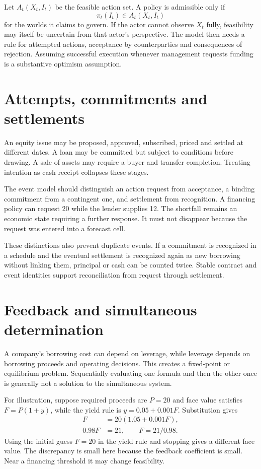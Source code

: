 Let $A_t(X_t,I_t)$ be the feasible action set. A policy is admissible only if
\begin{equation}
 \pi_t(I_t)\in A_t(X_t,I_t)
\end{equation}
for the worlds it claims to govern. If the actor cannot observe $X_t$ fully, feasibility may itself be uncertain from that actor's perspective. The model then needs a rule for attempted actions, acceptance by counterparties and consequences of rejection. Assuming successful execution whenever management requests funding is a substantive optimism assumption.

\section{Attempts, commitments and settlements}
An equity issue may be proposed, approved, subscribed, priced and settled at different dates. A loan may be committed but subject to conditions before drawing. A sale of assets may require a buyer and transfer completion. Treating intention as cash receipt collapses these stages.

The event model should distinguish an action request from acceptance, a binding commitment from a contingent one, and settlement from recognition. A financing policy can request 20 while the lender supplies 12. The shortfall remains an economic state requiring a further response. It must not disappear because the request was entered into a forecast cell.

These distinctions also prevent duplicate events. If a commitment is recognized in a schedule and the eventual settlement is recognized again as new borrowing without linking them, principal or cash can be counted twice. Stable contract and event identities support reconciliation from request through settlement.

\section{Feedback and simultaneous determination}
A company's borrowing cost can depend on leverage, while leverage depends on borrowing proceeds and operating decisions. This creates a fixed-point or equilibrium problem. Sequentially evaluating one formula and then the other once is generally not a solution to the simultaneous system.

For illustration, suppose required proceeds are $P=20$ and face value satisfies $F=P(1+y)$, while the yield rule is $y=0.05+0.001F$. Substitution gives
\begin{align}
 F&=20(1.05+0.001F),\\
 0.98F&=21,\qquad F=21/0.98.
\end{align}
Using the initial guess $F=20$ in the yield rule and stopping gives a different face value. The discrepancy is small here because the feedback coefficient is small. Near a financing threshold it may change feasibility.

